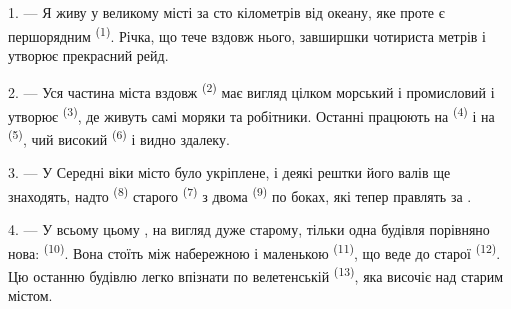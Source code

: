 %
%

\VUsaut{2.0mm}
\VUsaut{3.0mm}
\VUfilet{16mm}
\VUsaut{5.6mm}
\VUsaut{1.4mm}
\VUsaut{2.2mm}

\VUsaut{3.0mm}

1. --- Я живу у великому місті за сто кілометрів від океану, яке проте є
першорядним  \textsuperscript{(1)}. Річка, що тече вздовж нього,
завширшки чотириста метрів і утворює прекрасний рейд.

2. --- Уся частина міста вздовж  \textsuperscript{(2)} має
вигляд цілком морський і промисловий і утворює 
\textsuperscript{(3)}, де живуть самі моряки та робітники. Останні працюють на
 \textsuperscript{(4)} і на 
\textsuperscript{(5)}, чий високий  \textsuperscript{(6)} і
 видно здалеку.

3. --- У Середні віки місто було укріплене, і деякі рештки його валів ще
знаходять, надто  \textsuperscript{(8)} старого  \textsuperscript{(7)} з двома  \textsuperscript{(9)} по
боках, які тепер правлять за .

4. --- У всьому цьому , на вигляд дуже старому, тільки одна
будівля порівняно нова:  \textsuperscript{(10)}. Вона стоїть між
набережною і маленькою  \textsuperscript{(11)}, що веде до старої
 \textsuperscript{(12)}. Цю останню будівлю легко впізнати по
велетенській  \textsuperscript{(13)}, яка височіє над
старим містом.

